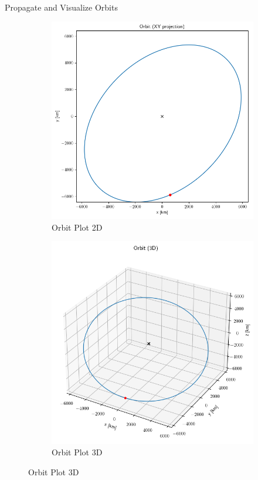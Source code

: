 \begin{hwkProblem}{4}{Propagate and Visualize Orbits}
	\begin{figure}[H] \label{fig:s04a}
		\begin{subfigure}{0.5\textwidth} \label{fig:s04a1}
			\begin{center}
				\includegraphics[width=\linewidth]{./outputs/figures/s04a1.png}
			\end{center}
			\caption{Orbit Plot 2D}
		\end{subfigure}
		\begin{subfigure}{0.5\textwidth} \label{fig:s04a2}
			\begin{center}
				\includegraphics[width=\linewidth]{./outputs/figures/s04a2.png}
			\end{center}
			\caption{Orbit Plot 3D}
		\end{subfigure}
	\end{figure}


\end{hwkProblem}
